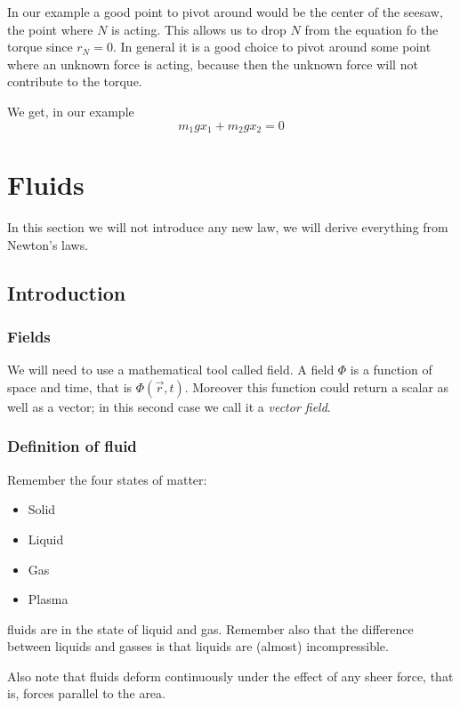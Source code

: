 \documentclass[14pt]{extarticle}
\begin{document}
In our example a good point to pivot around would be the center of the seesaw, the point where $N$ is acting.
This allows us to drop $N$ from the equation fo the torque since $r_N = 0$.
In general it is a good choice to pivot around some point where an unknown force is acting, because then the unknown force will not contribute to the torque.

We get, in our example
\begin{equation}
    m_1 g x_1 + m_2 g x_2 = 0
\end{equation}

\section{Fluids}

In this section we will not introduce any new law, we will derive everything from Newton's laws.

\subsection{Introduction}

\subsubsection{Fields}

We will need to use a mathematical tool called field.
A field $\Phi$ is a function of space and time, that is $\Phi(\vec{r}, t)$.
Moreover this function could return a scalar as well as a vector; in this second case we call it a \emph{vector field}.

\subsubsection{Definition of fluid}

Remember the four states of matter:
\begin{itemize}
    \item Solid
    \item Liquid
    \item Gas
    \item Plasma
\end{itemize}
fluids are in the state of liquid and gas.
Remember also that the difference between liquids and gasses is that liquids are (almost) incompressible.

Also note that fluids deform continuously under the effect of any sheer force, that is, forces parallel to the area.
\end{document}
